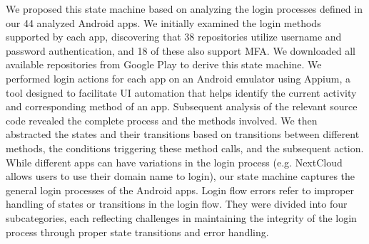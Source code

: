 We proposed this state machine based on analyzing the login processes defined in our 44 analyzed Android apps. We initially examined the login methods supported by each app, discovering that 38 repositories utilize username and password authentication, and 18 of these also support MFA.
We downloaded all available repositories from Google Play to derive this state machine. We performed login actions for each app on an Android emulator using Appium\cite{appium}, a tool designed to facilitate UI automation that helps identify the current activity and corresponding method of an app. Subsequent analysis of the relevant source code revealed the complete process and the methods involved. We then abstracted the states and their transitions based on transitions between different methods, the conditions triggering these method calls, and the subsequent action.
While different apps can have variations in the login process (e.g. NextCloud\cite{nextcloud-android} allows users to use their domain name to login), our state machine captures the general login processes of the Android apps.
Login flow errors refer to improper handling of states or transitions in the login flow. They were divided into four subcategories, each reflecting challenges in maintaining the integrity of the login process through proper state transitions and error handling.
